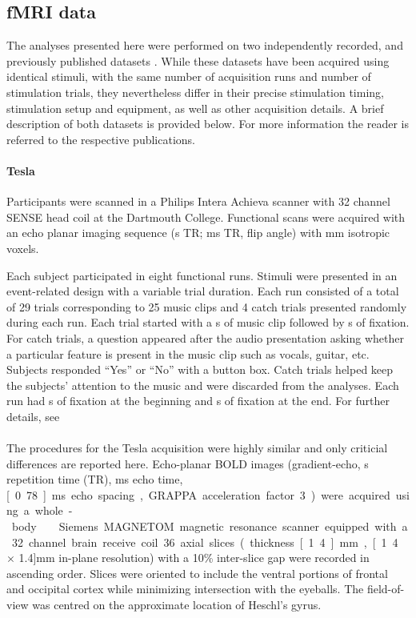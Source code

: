 \subsection*{fMRI data}

The analyses presented here were performed on two independently recorded, and
previously published datasets \citep{CTK+2012,HDH+2015} . While these datasets
have been acquired using identical stimuli, with the same number of acquisition
runs and number of stimulation trials, they nevertheless differ in their
precise stimulation timing, stimulation setup and equipment, as well as other
acquisition details. A brief description of both datasets is provided below.
For more information the reader is referred to the respective publications.

\paragraph{\unit[3]{Tesla}}
%
Participants were scanned in a Philips Intera Achieva scanner with 32 channel
SENSE head coil at the Dartmouth College. Functional scans were acquired with
an echo planar imaging sequence (\unit[2]{s} TR; \unit[35]{ms} TR,
\unit[90]{\textdegree} flip angle) with \unit[3]{mm} isotropic voxels.

Each subject participated in eight functional runs. Stimuli were presented in
an event-related design with a variable trial duration. Each run consisted of a
total of 29 trials corresponding to 25 music clips and 4 catch trials presented
randomly during each run. Each trial started with a \unit[6]{s} of music clip
followed by \unit[4-8]{s} of fixation. For catch trials, a question appeared
after the audio presentation asking whether a particular feature is present in
the music clip such as vocals, guitar, etc. Subjects responded “Yes” or “No”
with a button box. Catch trials helped keep the subjects’ attention to the
music and were discarded from the analyses. Each run had \unit[4]{s} of
fixation at the beginning and \unit[10]{s} of fixation at the end. For further
details, see \citet{CTK+2012}

\paragraph{\sevenT}
%
The procedures for the \unit[7]{Tesla} acquisition were highly similar and only
criticial differences are reported here. Echo-planar BOLD images
(gradient-echo, \unit[2]{s} repetition time (TR), \unit[22]{ms} echo time,
\unit[0.78]{ms} echo spacing, GRAPPA acceleration factor 3) were acquired using
a whole-body \sevenT\ Siemens MAGNETOM magnetic resonance scanner equipped with
a 32 channel brain receive coil. 36 axial slices (thickness \unit[1.4]{mm},
\unit[1.4 $\times$ 1.4]{mm} in-plane resolution) with a 10\% inter-slice gap
were recorded in ascending order.  Slices were oriented to include the ventral
portions of frontal and occipital cortex while minimizing intersection with the
eyeballs. The field-of-view was centred on the approximate location of Heschl's
gyrus.

